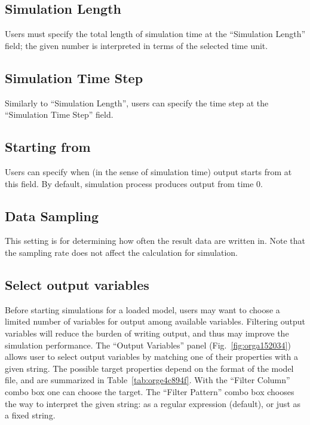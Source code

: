\documentclass[a4paper,10pt]{report}
\begin{document}
\subsection{Simulation Length}
\label{sec:orgcabcb02}
Users must specify the total length of simulation time at the ``Simulation Length''
field; the given number is interpreted in terms of the selected time unit.

\subsection{Simulation Time Step}
\label{sec:org03c24bc}
Similarly to ``Simulation Length'', users can specify the time step at the
``Simulation Time Step'' field.

\subsection{Starting from}
\label{sec:org6eea628}
Users can specify when (in the sense of simulation time) output starts from
at this field. By default, simulation process produces output from time 0.

\subsection{Data Sampling}
\label{sec:orgf2ac97b}
This setting is for determining how often the result data are written in.
Note that the sampling rate does not affect the calculation for simulation.

\subsection{Select output variables}
\label{sec:org566a959}
Before starting simulations for a loaded model, users may want to choose a
limited number of variables for output among available variables.
Filtering output variables will reduce the burden of writing output, and thus
may improve the simulation performance.
The ``Output Variables'' panel (Fig.~\ref{fig:orga152034}) allows
user to select output variables by matching one of their properties with a given
string. The possible target properties depend on the format of the model file,
and are summarized in Table~\ref{tab:orge4c894f}. With the ``Filter Column''
combo box one can choose the target. The ``Filter Pattern'' combo box chooses
the way to interpret the given string: as a regular expression (default), or
just as a fixed string.
\end{document}
